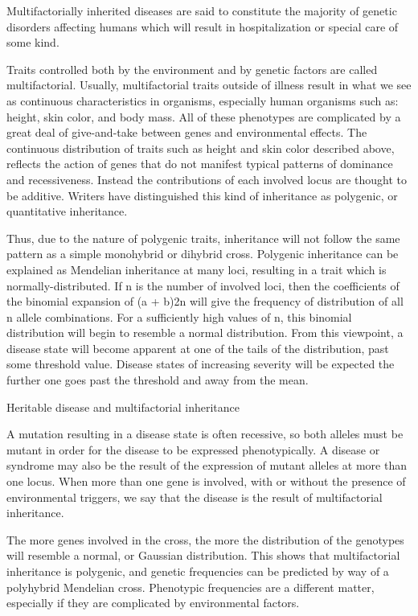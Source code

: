 Multifactorially inherited diseases are said to constitute the majority of genetic disorders affecting humans which will result in hospitalization or special care of some kind.

Traits controlled both by the environment and by genetic factors are called multifactorial. Usually, multifactorial traits outside of illness result in what we see as continuous characteristics in organisms, especially human organisms such as: height, skin color, and body mass. All of these phenotypes are complicated by a great deal of give-and-take between genes and environmental effects. The continuous distribution of traits such as height and skin color described above, reflects the action of genes that do not manifest typical patterns of dominance and recessiveness. Instead the contributions of each involved locus are thought to be additive. Writers have distinguished this kind of inheritance as polygenic, or quantitative inheritance.

Thus, due to the nature of polygenic traits, inheritance will not follow the same pattern as a simple monohybrid or dihybrid cross. Polygenic inheritance can be explained as Mendelian inheritance at many loci, resulting in a trait which is normally-distributed. If n is the number of involved loci, then the coefficients of the binomial expansion of (a + b)2n will give the frequency of distribution of all n allele combinations. For a sufficiently high values of n, this binomial distribution will begin to resemble a normal distribution. From this viewpoint, a disease state will become apparent at one of the tails of the distribution, past some threshold value. Disease states of increasing severity will be expected the further one goes past the threshold and away from the mean.

Heritable disease and multifactorial inheritance

A mutation resulting in a disease state is often recessive, so both alleles must be mutant in order for the disease to be expressed phenotypically. A disease or syndrome may also be the result of the expression of mutant alleles at more than one locus. When more than one gene is involved, with or without the presence of environmental triggers, we say that the disease is the result of multifactorial inheritance.

The more genes involved in the cross, the more the distribution of the genotypes will resemble a normal, or Gaussian distribution. This shows that multifactorial inheritance is polygenic, and genetic frequencies can be predicted by way of a polyhybrid Mendelian cross. Phenotypic frequencies are a different matter, especially if they are complicated by environmental factors.

